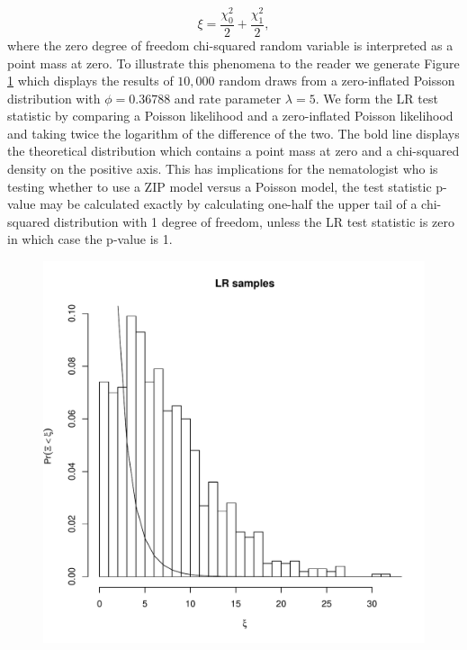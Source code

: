 \documentclass{article}
\begin{document}
\begin{equation}
\xi = \frac{\chi^2_0}{2} + \frac{\chi^2_1}{2},
\end{equation}
where the zero degree of freedom chi-squared random variable is interpreted as a point mass at zero. To illustrate this phenomena to the reader we generate Figure \ref{fig:twice_log_likelihood} which displays the results of $10,000$ random draws from a zero-inflated Poisson distribution with $\phi=0.36788$ and rate parameter $\lambda=5$. 
We form the LR test statistic by comparing a Poisson likelihood and a zero-inflated Poisson likelihood and taking twice the logarithm of the difference of the two. The bold line displays the  theoretical distribution which contains a point mass at zero and a chi-squared density on the positive axis. This has implications for the nematologist who is testing whether to use a ZIP model versus a Poisson model, the test statistic p-value may be calculated exactly by calculating one-half the upper tail of a chi-squared distribution with 1 degree of freedom, unless the LR test statistic is zero in which case the p-value is 1. 
\begin{figure}[H]
\label{fig:twice_log_likelihood}
\vspace{0.5in}
\begin{center}
\includegraphics[scale=0.6]{hist.pdf}
\end{center}
\end{figure}
\end{document}
